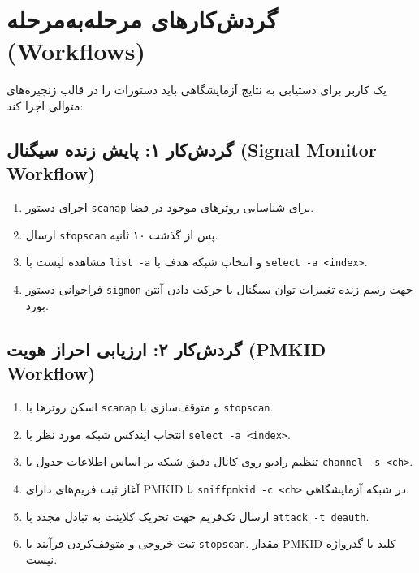 \documentclass[11pt,a4paper]{article}
\newcommand{\lr}[1]{\foreignlanguage{english}{#1}}
\newcommand{\en}[1]{\lr{#1}}
\begin{document}
\newpage
\section{گردش‌کارهای مرحله‌به‌مرحله \en{(Workflows)}}
یک کاربر برای دستیابی به نتایج آزمایشگاهی باید دستورات را در قالب زنجیره‌های متوالی اجرا کند:

\subsection{گردش‌کار ۱: پایش زنده سیگنال \en{(Signal Monitor Workflow)}}
\begin{enumerate}
    \item اجرای دستور \lr{\texttt{scanap}} برای شناسایی روترهای موجود در فضا.
    \item ارسال \lr{\texttt{stopscan}} پس از گذشت ۱۰ ثانیه.
    \item مشاهده لیست با \lr{\texttt{list -a}} و انتخاب شبکه هدف با \lr{\texttt{select -a <index>}}.
    \item فراخوانی دستور \lr{\texttt{sigmon}} جهت رسم زنده تغییرات توان سیگنال با حرکت دادن آنتن بورد.
\end{enumerate}

\subsection{گردش‌کار ۲: ارزیابی احراز هویت \en{(PMKID Workflow)}}
\begin{enumerate}
    \item اسکن روترها با \lr{\texttt{scanap}} و متوقف‌سازی با \lr{\texttt{stopscan}}.
    \item انتخاب ایندکس شبکه مورد نظر با \lr{\texttt{select -a <index>}}.
    \item تنظیم رادیو روی کانال دقیق شبکه بر اساس اطلاعات جدول با \lr{\texttt{channel -s <ch>}}.
    \item آغاز ثبت فریم‌های دارای \en{PMKID} با \lr{\texttt{sniffpmkid -c <ch>}} در شبکه آزمایشگاهی.
    \item ارسال تک‌فریم جهت تحریک کلاینت به تبادل مجدد با \lr{\texttt{attack -t deauth}}.
    \item ثبت خروجی و متوقف‌کردن فرآیند با \lr{\texttt{stopscan}}. مقدار \en{PMKID} کلید یا گذرواژه نیست.
\end{enumerate}
\end{document}
